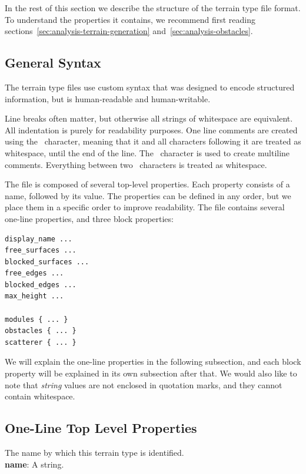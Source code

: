 In the rest of this section we describe the structure of the terrain type file format.
To understand the properties it contains, we recommend first reading sections~\ref{sec:analysis-terrain-generation} and~\ref{sec:analysis-obstacles}.

\subsection{General Syntax}

The terrain type files use custom syntax that was designed to encode structured information, but is human-readable and human-writable.

Line breaks often matter, but otherwise all strings of whitespace are equivalent.
All indentation is purely for readability purposes.
One line comments are created using the \mono{\#}~character, meaning that it and all characters following it are treated as whitespace, until the end of the line.
The \mono{\%}~character is used to create multiline comments.
Everything between two \mono{\%}~characters is treated as whitespace.

The file is composed of several top-level properties.
Each property consists of a name, followed by its value.
The properties can be defined in any order, but we place them in a specific order to improve readability.
The file contains several one-line properties, and three block properties:
\begin{verbatim}
display_name ...
free_surfaces ...
blocked_surfaces ...
free_edges ...
blocked_edges ...
max_height ...

modules { ... }
obstacles { ... }
scatterer { ... }
\end{verbatim}

We will explain the one-line properties in the following subsection, and each block property will be explained in its own subsection after that.
We would also like to note that \emph{string} values are not enclosed in quotation marks, and they cannot contain whitespace.

\subsection{One-Line Top Level Properties}

The name by which this terrain type is identified.\\
\textbf{name}: A string.

